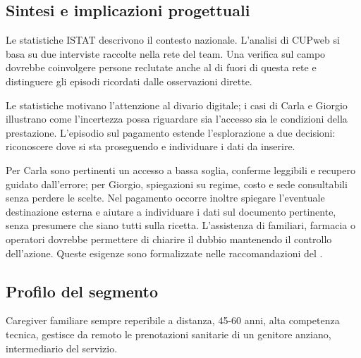 \subsection{Sintesi e implicazioni progettuali}


Le statistiche ISTAT descrivono il contesto nazionale. L'analisi di CUPweb
si basa su due interviste raccolte nella rete del team. Una verifica sul
campo dovrebbe coinvolgere persone reclutate anche al di fuori di questa
rete e distinguere gli episodi ricordati dalle osservazioni dirette.


Le statistiche motivano l'attenzione al divario digitale; i casi di Carla
e Giorgio illustrano come l'incertezza possa riguardare sia l'accesso sia
le condizioni della prestazione. L'episodio sul pagamento estende
l'esplorazione a due decisioni: riconoscere dove si sta proseguendo e
individuare i dati da inserire.


Per Carla sono pertinenti un accesso a bassa soglia, conferme leggibili e
recupero guidato dall'errore; per Giorgio, spiegazioni su regime, costo e sede
consultabili senza perdere le scelte. Nel pagamento occorre inoltre
spiegare l'eventuale destinazione esterna e aiutare a individuare i dati
sul documento pertinente, senza presumere che siano tutti sulla ricetta.
L'assistenza di familiari, farmacia o operatori dovrebbe permettere di
chiarire il dubbio mantenendo il controllo dell'azione. Queste esigenze
sono formalizzate nelle raccomandazioni del .

\label{doc:a:04b}

\subsection{Profilo del segmento}


Caregiver familiare sempre reperibile a distanza, 45-60 anni, alta competenza
tecnica, gestisce da remoto le prenotazioni sanitarie di un genitore
anziano, intermediario del servizio.


